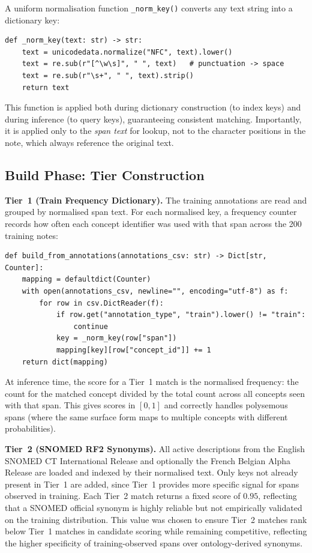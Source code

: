 A uniform normalisation function \texttt{\_norm\_key()} converts any text string into a dictionary key:

\begin{verbatim}
def _norm_key(text: str) -> str:
    text = unicodedata.normalize("NFC", text).lower()
    text = re.sub(r"[^\w\s]", " ", text)   # punctuation -> space
    text = re.sub(r"\s+", " ", text).strip()
    return text
\end{verbatim}

This function is applied both during dictionary construction (to index keys) and during inference (to query keys), guaranteeing consistent matching. Importantly, it is applied only to the \textit{span text} for lookup, not to the character positions in the note, which always reference the original text.

\subsection{Build Phase: Tier Construction}

\textbf{Tier~1 (Train Frequency Dictionary).} The training annotations are read and grouped by normalised span text. For each normalised key, a frequency counter records how often each concept identifier was used with that span across the 200 training notes:

\begin{verbatim}
def build_from_annotations(annotations_csv: str) -> Dict[str, Counter]:
    mapping = defaultdict(Counter)
    with open(annotations_csv, newline="", encoding="utf-8") as f:
        for row in csv.DictReader(f):
            if row.get("annotation_type", "train").lower() != "train":
                continue
            key = _norm_key(row["span"])
            mapping[key][row["concept_id"]] += 1
    return dict(mapping)
\end{verbatim}

At inference time, the score for a Tier~1 match is the normalised frequency: the count for the matched concept divided by the total count across all concepts seen with that span. This gives scores in $[0, 1]$ and correctly handles polysemous spans (where the same surface form maps to multiple concepts with different probabilities).

\textbf{Tier~2 (SNOMED RF2 Synonyms).} All active descriptions from the English SNOMED CT International Release and optionally the French Belgian Alpha Release are loaded and indexed by their normalised text. Only keys not already present in Tier~1 are added, since Tier~1 provides more specific signal for spans observed in training. Each Tier~2 match returns a fixed score of $0.95$, reflecting that a SNOMED official synonym is highly reliable but not empirically validated on the training distribution. This value was chosen to ensure Tier~2 matches rank below Tier~1 matches in candidate scoring while remaining competitive, reflecting the higher specificity of training-observed spans over ontology-derived synonyms.

